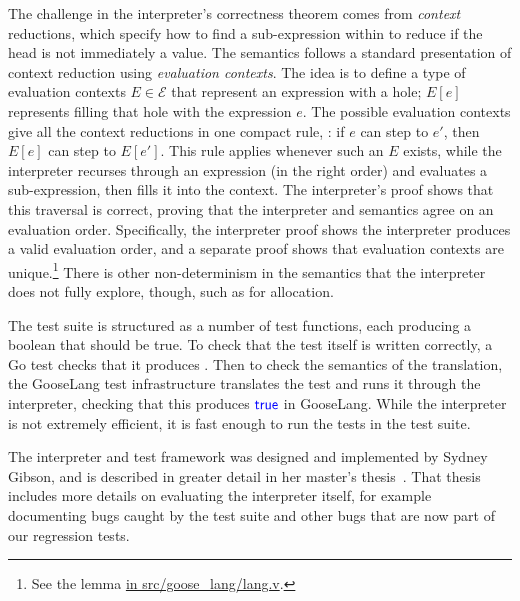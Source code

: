 The challenge in the interpreter's correctness theorem comes from \emph{context} reductions,
which specify how to find a sub-expression within  to reduce
if the head is not immediately a value. The semantics follows a standard
presentation of context reduction using \emph{evaluation contexts}. The
idea is to define a type of evaluation contexts $E \in \mathcal{E}$ that
represent an expression with a hole; $E[e]$ represents filling that hole with
the expression $e$. The possible evaluation
contexts give all the context reductions in one compact rule, : if $e$
can step to $e'$, then $E[e]$ can step to $E[e']$. This rule applies whenever
such an $E$ exists, while the
interpreter recurses through an expression (in the right order) and
evaluates a sub-expression, then fills it into the context. The interpreter's
proof shows that
this traversal is correct, proving that the interpreter and semantics agree on an
evaluation order. Specifically, the interpreter proof shows the interpreter
produces a valid evaluation order, and a separate proof shows that evaluation
contexts are unique.\footnote{See the lemma
\href{https://github.com/mit-pdos/perennial/blob/6f5ed5e7c2d3e8d657a0022c51e1d1e32a81e671/src/goose_lang/lang.v\#L1443-L1447}%
{ in src/goose\_lang/lang.v}.} There is other non-determinism in the semantics that the
interpreter does not fully explore, though, such as for allocation.

The test suite is structured as a number of test functions, each producing a
boolean that should be true. To check that the test itself is written correctly,
a Go test checks that it produces . Then to check the semantics of
the translation, the GooseLang test infrastructure translates the test and runs
it through the interpreter, checking that this produces $\mathsf{\textcolor{blue}{true}}$ in
GooseLang. While the interpreter is not extremely efficient, it is fast enough
to run the tests in the test suite.

The interpreter and test framework was designed and implemented by
Sydney Gibson, and is described in greater detail in her master's
thesis~\cite{gibsons-meng}. That thesis includes more details on evaluating the
interpreter itself, for example documenting bugs caught by the test suite and
other bugs that are now part of our regression tests.
